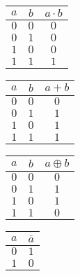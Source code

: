 \begin{Row}
	\begin{Cell}{1}
		\centering
		\begin{tabular}{cc|c}
			\toprule
			$a$ & $b$ & $a\cdot b$ \\
			\midrule
			$0$ & $0$ & $0$        \\
			$0$ & $1$ & $0$        \\
			$1$ & $0$ & $0$        \\
			$1$ & $1$ & $1$        \\
			\bottomrule
		\end{tabular}
		\vspace{1ex}
	\end{Cell}
	\begin{Cell}{1}
		\centering
		\begin{tabular}{cc|c}
			\toprule
			$a$ & $b$ & $a+b$ \\
			\midrule
			$0$ & $0$ & $0$   \\
			$0$ & $1$ & $1$   \\
			$1$ & $0$ & $1$   \\
			$1$ & $1$ & $1$   \\
			\bottomrule
		\end{tabular}
		\vspace{1ex}
	\end{Cell}
	\begin{Cell}{1}
		\centering
		\begin{tabular}{cc|c}
			\toprule
			$a$ & $b$ & $a \oplus b$ \\
			\midrule
			$0$ & $0$ & $0$          \\
			$0$ & $1$ & $1$          \\
			$1$ & $0$ & $1$          \\
			$1$ & $1$ & $0$          \\
			\bottomrule
		\end{tabular}
		\vspace{1ex}
	\end{Cell}
	\begin{Cell}{1}
		\centering
		\begin{tabular}{c|c}
			\toprule
			$a$ & $\overline{a}$ \\
			\midrule
			$0$ & $1$            \\
			$1$ & $0$            \\
			\bottomrule
		\end{tabular}
		\vspace{1ex}
	\end{Cell}
\end{Row}
